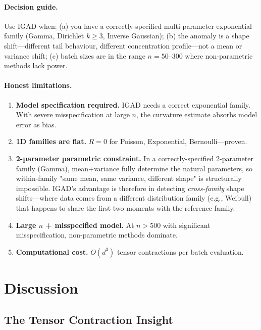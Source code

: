 \documentclass[12pt]{article}
\begin{document}
\paragraph{Decision guide.}
Use IGAD when: (a) you have a correctly-specified multi-parameter exponential
family (Gamma, Dirichlet $k\geq 3$, Inverse Gaussian); (b) the anomaly is a
shape shift---different tail behaviour, different concentration profile---not a
mean or variance shift; (c) batch sizes are in the range $n=50$--$300$ where
non-parametric methods lack power.

\paragraph{Honest limitations.}
\begin{enumerate}
  \item \textbf{Model specification required.} IGAD needs a correct exponential family. With severe misspecification at large $n$, the curvature estimate absorbs model error as bias.
  \item \textbf{1D families are flat.} $R=0$ for Poisson, Exponential, Bernoulli---proven.
  \item \textbf{2-parameter parametric constraint.} In a correctly-specified 2-parameter family (Gamma), mean+variance fully determine the natural parameters, so within-family "same mean, same variance, different shape" is structurally impossible. IGAD's advantage is therefore in detecting \emph{cross-family} shape shifts---where data comes from a different distribution family (e.g., Weibull) that happens to share the first two moments with the reference family.
  \item \textbf{Large $n$ + misspecified model.} At $n>500$ with significant misspecification, non-parametric methods dominate.
  \item \textbf{Computational cost.} $O(d^3)$ tensor contractions per batch evaluation.
\end{enumerate}

\section{Discussion}

\subsection{The Tensor Contraction Insight}
\end{document}
